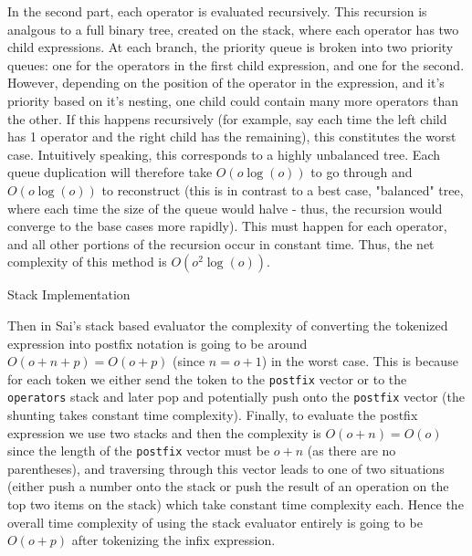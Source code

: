 \documentclass[11pt]{article}
\begin{document}
In the second part, each operator is evaluated recursively.
This recursion is analgous to a full binary tree, created on the stack, where each operator has two child expressions.
At each branch, the priority queue is broken into two priority queues: one for the operators in the first child expression, and one for the second.
However, depending on the position of the operator in the expression, and it's priority based on it's nesting, one child could contain many more operators than the other.
If this happens recursively (for example, say each time the left child has 1 operator and the right child has the remaining), this constitutes the worst case.
Intuitively speaking, this corresponds to a highly unbalanced tree.
Each queue duplication will therefore take $O(o\log(o))$ to go through and $O(o\log(o))$ to reconstruct (this is in contrast to a best case, "balanced" tree, where each time the size of the queue would halve - thus, the recursion would converge to the base cases more rapidly).
This must happen for each operator, and all other portions of the recursion occur in constant time.
Thus, the net complexity of this method is $O(o^2\log(o))$.

\centerline{Stack Implementation}
Then in Sai's stack based evaluator the complexity of converting the tokenized expression into postfix notation is going to be around $O(o+n+p) = O(o+p)$ (since $n=o+1$) in the worst case.
This is because for each token we either send the token to the \texttt{postfix} vector or to the \texttt{operators} stack and later pop and potentially push onto the \texttt{postfix} vector (the shunting takes constant time complexity).
Finally, to evaluate the postfix expression we use two stacks and then the complexity is $O(o+n) = O(o)$ since the length of the \texttt{postfix} vector must be $o+n$ (as there are no parentheses), and traversing through this vector leads to one of two situations (either push a number onto the stack or push the result of an operation on the top two items on the stack) which take constant time complexity each.
Hence the overall time complexity of using the stack evaluator entirely is going to be $O(o+p)$ after tokenizing the infix expression.
\end{document}
